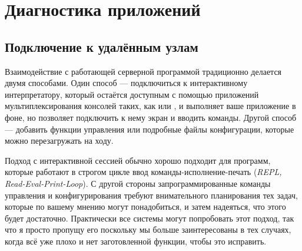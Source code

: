 \documentclass[11pt, oneside]{book}   	%
\begin{document}

\part{Диагностика приложений}
\label{part:diagnosing-applictions}


\chapter{Подключение к удалённым узлам}
\label{chap:connecting}

Взаимодействие с работающей серверной программой традиционно делается двумя способами. Один способ --- подключиться к интерактивному интерпретатору, который остаётся доступным с помощью приложений мультиплексирования консолей таких, как  или , и выполняет ваше приложение в фоне, но позволяет подключить к нему экран и вводить команды. Другой способ --- добавить функции управления или подробные файлы конфигурации, которые можно перезагружать на ходу.

Подход с интерактивной сессией обычно хорошо подходит для программ, которые работают в строгом цикле ввод команды-исполнение-печать (\emph{REPL, Read-Eval-Print-Loop}). С другой стороны запрограммированные команды управления и конфигурирования требуют внимательного планирования тех задач, которые по вашему мнению могут понадобиться, и затем надеяться, что этого будет достаточно. Практически все системы могут попробовать этот подход, так что я просто пропущу его поскольку мы больше заинтересованы в тех случаях, когда всё уже плохо и нет заготовленной функции, чтобы это исправить.
\end{document}
